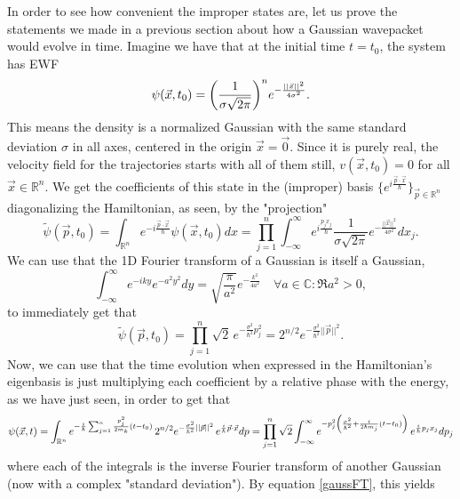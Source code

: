 \documentclass[11pt, a4paper]{article} %
\newcommand{\R}{\mathbb{R}} %
\newcommand{\C}{\mathbb{C}}
\begin{document}
In order to see how convenient the improper states are, let us prove the statements we made in a previous section about how a Gaussian wavepacket would evolve in time. Imagine we have that at the initial time $t=t_0$, the system has EWF
\begin{equation}
\psi(\vec{x},t_0)=\qty(\frac{1}{\sigma\sqrt{2\pi}})^ne^{-\frac{||\vec{x}||^2}{4\sigma^2}}.
\end{equation}
This means the density is a normalized Gaussian with the same standard deviation $\sigma$ in all axes, centered in the origin $\vec{x}=\vec{0}$. Since it is purely real, the velocity field for the trajectories starts with all of them still, $v(\vec{x},t_0)=0$ for all $\vec{x}\in\R^n$. We get the coefficients of this state in the (improper) basis $\{e^{i\frac{\vec{p}\cdot\vec{x}}{\hbar}}\}_{\vec{p}\in\R^n}$ diagonalizing the Hamiltonian, as seen, by the "projection"
\begin{equation}
\tilde{\psi}(\vec{p},t_0)=\int_{\R^n}e^{-i\frac{\vec{p}\cdot\vec{x}}{\hbar}}\psi(\vec{x},t_0)dx = \prod_{j=1}^n \int_{-\infty}^\infty e^{i\frac{p_jx_j}{\hbar}}\frac{1}{\sigma\sqrt{2\pi}}e^{-\frac{||\vec{x}||^2}{4\sigma^2}} dx_j.
\end{equation}
We can use that the 1D Fourier transform of a Gaussian is itself a Gaussian,
\begin{equation}\label{gaussFT}
\int_{-\infty}^\infty e^{-iky} e^{-a^2y^2}dy = \sqrt{\frac{\pi}{a^2}}e^{-\frac{k^2}{4a^2}} \quad \forall a\in\C:\Re{a^2}>0,
\end{equation}
to immediately get that
\begin{equation}
\tilde{\psi}(\vec{p},t_0)=\prod_{j=1}^n\sqrt{2}\,e^{-\frac{\sigma^2}{\hbar^2}p_j^2}=2^{n/2}e^{-\frac{\sigma^2}{\hbar^2}||\vec{p}||^2}.
\end{equation}
Now, we can use that the time evolution when expressed in the Hamiltonian's eigenbasis is just multiplying each coefficient by a relative phase with the energy, as we have just seen, in order to get that
\begin{equation}
\psi(\vec{x},t)=\int_{\R^n}e^{-\frac{i}{\hbar}\sum_{j=1}^n \frac{p_j^2}{2m_k}(t-t_0)}\, 2^{n/2}e^{-\frac{\sigma^2}{\hbar^2}||\vec{p}||^2} \,e^{\frac{i}{\hbar}\vec{p}\cdot\vec{x}}dp=\prod_{j=1}^n\sqrt{2}\int_{-\infty}^\infty e^{-p_j^2\qty(\frac{\sigma^2}{\hbar^2}+\frac{i}{2\hbar m_j}(t-t_0) )}\,e^{\frac{i}{\hbar}p_jx_j} dp_j
\end{equation}
where each of the integrals is the inverse Fourier transform of another Gaussian (now with a complex "standard deviation"). By equation \eqref{gaussFT}, this yields
\end{document}

